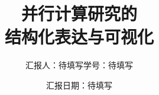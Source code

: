 \documentclass[aspectratio=169,11pt]{ctexbeamer}
\title[并行计算研究表达]{并行计算研究的\\结构化表达与可视化}
\author{汇报人：待填写\qquad 学号：待填写}
\institute{哈尔滨工业大学}
\date{汇报日期：待填写}
\begin{document}
\TitleSlide
\OutlineSlide




\hitappendix

\end{document}
